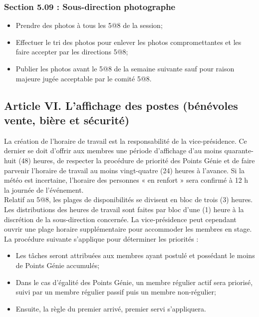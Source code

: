 \subsubsection*{Section 5.09 : Sous-direction photographe}
\begin{itemize}
\item Prendre des photos à tous les 5@8 de la session;
\item Effectuer le tri des photos pour enlever les photos compromettantes et les faire accepter par les directions 5@8;
\item Publier les photos avant le 5@8 de la semaine suivante sauf pour raison majeure jugée acceptable par le comité 5@8.
\end{itemize}

\subsection*{Article VI. L'affichage des postes (bénévoles vente, bière et sécurité)}
La création de l’horaire de travail est la responsabilité de la vice-présidence. Ce dernier se doit d’offrir aux membres une période d’affichage d’au moins quarante-huit (48) heures, de respecter la procédure de priorité des Points Génie et de faire parvenir l’horaire de travail au moins vingt-quatre (24) heures à l’avance. Si la météo est incertaine, l'horaire des personnes « en renfort » sera confirmé à 12 h la journée de l'événement. \\

Relatif au 5@8, les plages de disponibilités se divisent en bloc de trois (3) heures. Les distributions des heures de travail sont faites par bloc d’une (1) heure à la discrétion de la sous-direction concernée. La vice-présidence peut cependant ouvrir une plage horaire supplémentaire pour accommoder les membres en stage.\\

La procédure suivante s'applique pour déterminer les priorités :
\begin{itemize}
\item Les tâches seront attribuées aux membres ayant postulé et possédant le moins de Points Génie accumulés;
\item Dans le cas d'égalité des Points Génie, un membre régulier actif sera priorisé, suivi par un membre régulier passif puis un membre non-régulier;
\item Ensuite, la règle du premier arrivé, premier servi s'appliquera. 
\end{itemize}

